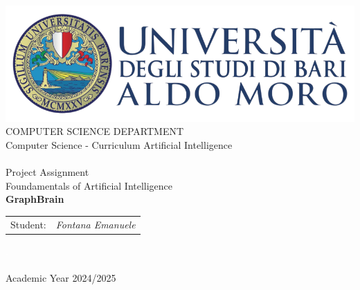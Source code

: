 \begin{titlepage}
    \begin{center}
        \includegraphics[scale=0.5]{images/uniba-logo.png}\\
        \vspace{0.5cm}
        {\large COMPUTER SCIENCE DEPARTMENT}\\
        \vspace{0.5cm}
        {\large Computer Science - Curriculum Artificial Intelligence}\\
        \hrulefill \\
        \vspace{0.5cm}
        {\large Project Assignment}\\
        \vspace{0.5cm}
        {\large Foundamentals of Artificial Intelligence}\\
        \vspace{0.5cm}
        {\LARGE \textbf{GraphBrain}}\\
        \vspace{0.5cm}

        \vfill
        \centering
        \begin{tabularx}{\textwidth}{@{}Xr@{}}
          {\large Student:} &
          {\large \textit{Fontana Emanuele}} \\ 
        \end{tabularx}
        \textcolor{white}{.} \\ 
        \vspace{0.5cm}
        \hrulefill \\
        {\large Academic Year 2024/2025}
    \end{center}
\end{titlepage}